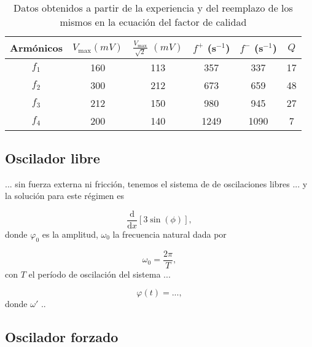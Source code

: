\documentclass[12pt,a4paper]{article}
\begin{document}
\begin{table}[H]
    \centering
    \begin{tabular}{|c|c|c|c|c|c|}
    \hline
    \multirow{1}{2.1cm}{\centering Armónicos} 
        & $V_\mathrm{max} (mV)$
        & $\frac{V_\mathrm{max}}{\sqrt{2}}$ $(mV)$ 
        & $f^+$ (s$^{-1}$) 
        & $f^-$ (s$^{-1}$)
        & $Q$ \\
    \hline
    $f_1$  & 160 & 113 & 357 & 337 & 17\\ \hline
    $f_2$  & 300 & 212 & 673 & 659 & 48\\ \hline
    $f_3$  & 212  & 150 & 980 & 945 & 27\\ \hline
    $f_4$  & 200  & 140 & 1249 & 1090 & 7\\ \hline
    \end{tabular}
    \caption{Datos obtenidos a partir de la experiencia y del reemplazo de los mismos en la ecuación del factor de calidad}
    \label{tabla3}
\end{table}















\subsection{Oscilador libre}

... sin fuerza externa ni fricción, tenemos el sistema de de oscilaciones libres ... y la solución para este régimen es

\begin{equation}
    \frac{\mathrm{d}}{\mathrm{d}x}\left[3 \sin\left({\phi}\right)\right],
\end{equation}
donde $\varphi_0$ es la amplitud, $\omega_0$ la frecuencia natural dada por

\begin{equation}\label{eq2}
    \omega_0=\frac{2\pi}{T},
\end{equation}
con $T$ el período de oscilación del sistema ...

\begin{equation}
    \varphi(t) = ... ,
\end{equation}
donde $\omega'$ ..

\subsection{Oscilador forzado}
\end{document}
